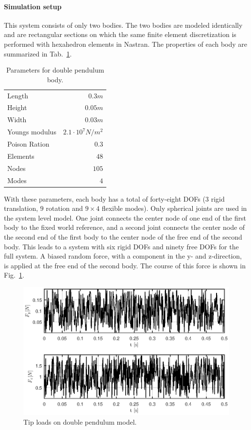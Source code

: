 \paragraph{Simulation setup}
This system consists of only two bodies. The two bodies are modeled identically and are rectangular sections on which the same finite element discretization is performed with hexahedron elements in Nastran. The properties of each body are summarized in Tab.~\ref{tab:DoublePendulumProperties}. 
\begin{table}[htp]
\centering
\caption{Parameters for double pendulum body.} \label{tab:DoublePendulumProperties}
\vspace{1ex}
\begin{tabular}{l r}
\toprule
Length 	& $0.3m$	\\[0.2ex]
Height & $0.05m$	\\[0.2ex]
Width & $0.03m$	\\[0.2ex]
Youngs modulus & $2.1\cdot 10^7 N/m^2$	\\[0.2ex]
Poison Ration & $0.3$	\\[0.2ex]
Elements & $48$	\\[0.2ex] 
Nodes & $105$	\\[0.2ex]
Modes & $4$	\\[0.2ex] 
\bottomrule
\end{tabular}
\end{table}
With these parameters, each body has a total of forty-eight DOFs ($3$ rigid translation, $9$ rotation and $9\times 4$ flexible modes).
Only spherical joints are used in the system level model. One joint connects the center node of one end of the first body to the fixed world reference, and a second joint connects the center node of the second end of the first body to the center node of the free end of the second body. This leads to a system with six rigid DOFs and ninety free DOFs for the full system. 
A biased random force, with a component in the y- and z-direction, is applied at the free end of the second body. The course of this force is shown in Fig.~\ref{fig:DoublePendulumLoad}.
\begin{figure}[htp]
\centering
\includegraphics[scale=1]{DoublePendulumLoad.eps} 
\caption{Tip loads on double pendulum model.}
\label{fig:DoublePendulumLoad}
\end{figure}
